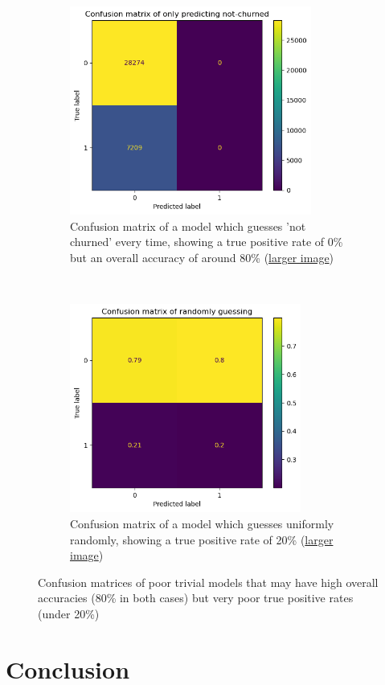 \documentclass[]{article}
\begin{document}
\begin{figure}[h!]
	\centering
	\begin{subfigure}[t]{0.55\textwidth}
		\centering
		\includegraphics[height=2.7in]{trivial_0}
		\caption{Confusion matrix of a model which guesses 'not churned' every time, showing a true positive rate of 0\% but an overall accuracy of around 80\%  (\href{https://github.com/ray33ee/Understanding-predicting-and-preventing-churn/blob/main/tex/trivial_0.png?raw=true}{larger image})}
	\end{subfigure}%
	~
	\begin{subfigure}[t]{0.55\textwidth}
		\centering
		\includegraphics[height=2.7in]{trivial_guesser}
		\caption{Confusion matrix of a model which guesses uniformly randomly, showing a true positive rate of 20\% (\href{https://github.com/ray33ee/Understanding-predicting-and-preventing-churn/blob/main/tex/trivial_guesser.png?raw=true}{larger image})}
	\end{subfigure}
	\caption{Confusion matrices of poor trivial models that may have high overall accuracies (80\% in both cases) but very poor true positive rates (under 20\%)}
\end{figure}

\section{Conclusion}
\end{document}
